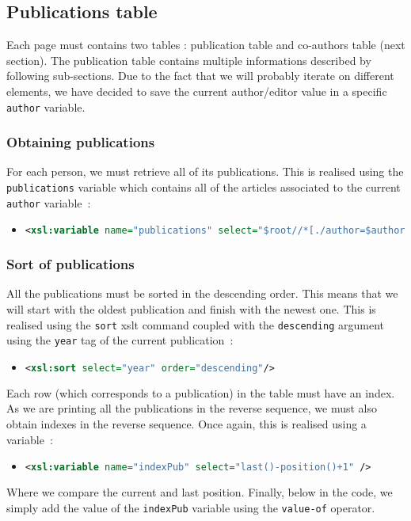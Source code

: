 \documentclass{article}
\begin{document}
  \subsection{Publications table}
  Each page must contains two tables : publication table and co-authors table (next section). The publication table contains multiple informations described by following sub-sections. Due to the fact that we will probably iterate on different elements, we have decided to save the current author/editor value in a specific \verb|author| variable.
    \subsubsection{Obtaining publications}
      For each person, we must retrieve all of its publications. This is realised using the \verb|publications| variable which contains all of the articles associated to the current \verb|author| variable~:
 \begin{itemize}
	\item \begin{lstlisting}[language=XML]
<xsl:variable name="publications" select="$root//*[./author=$author or ./editor=$author]" />\end{lstlisting}
      \end{itemize}
      
    \subsubsection{Sort of publications}
      All the publications must be sorted in the descending order. This means that we will start with the oldest publication and finish with the newest one. This is realised using the \verb|sort| xslt command coupled with the \verb|descending| argument using the \verb|year| tag of the current publication~:
      \begin{itemize}
	\item \begin{lstlisting}[language=XML]
<xsl:sort select="year" order="descending"/>\end{lstlisting}
      \end{itemize}
      Each row (which corresponds to a publication) in the table must have an index. As we are printing all the publications in the reverse sequence, we must also obtain indexes in the reverse sequence. Once again, this is realised using a variable~:
      \begin{itemize}
	\item \begin{lstlisting}[language=XML]
<xsl:variable name="indexPub" select="last()-position()+1" />\end{lstlisting}
      \end{itemize}
      Where we compare the current and last position. Finally, below in the code, we simply add the value of the \verb|indexPub| variable using the \verb|value-of| operator. 
      
\end{document}
